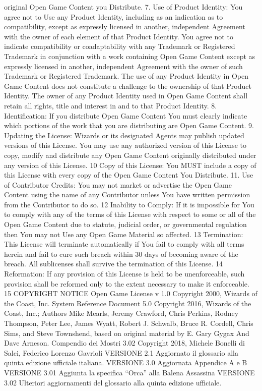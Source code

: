 \begin{multicols}{2}
original Open Game Content you Distribute.
7. Use of Product Identity: You agree not to Use
any Product Identity, including as an indication as
to compatibility, except as expressly licensed in
another, independent Agreement with the owner
of each element of that Product Identity. You
agree not to indicate compatibility or coadaptability with any Trademark or Registered
Trademark in conjunction with a work containing
Open Game Content except as expressly licensed
in another, independent Agreement with the
owner of such Trademark or Registered
Trademark. The use of any Product Identity in
Open Game Content does not constitute a
challenge to the ownership of that Product
Identity. The owner of any Product Identity used
in Open Game Content shall retain all rights, title
and interest in and to that Product Identity.
8. Identification: If you distribute Open Game
Content You must clearly indicate which portions
of the work that you are distributing are Open
Game Content.
9. Updating the License: Wizards or its designated
Agents may publish updated versions of this
License. You may use any authorized version of
this License to copy, modify and distribute any
Open Game Content originally distributed under
any version of this License.
10 Copy of this License: You MUST include a copy
of this License with every copy of the Open Game
Content You Distribute.
11. Use of Contributor Credits: You may not
market or advertise the Open Game Content
using the name of any Contributor unless You
have written permission from the Contributor to
do so.
12 Inability to Comply: If it is impossible for You
to comply with any of the terms of this License
with respect to some or all of the Open Game
Content due to statute, judicial order, or
governmental regulation then You may not Use
any Open Game Material so affected.
13 Termination: This License will terminate
automatically if You fail to comply with all terms
herein and fail to cure such breach within 30 days
of becoming aware of the breach. All sublicenses
shall survive the termination of this License.
14 Reformation: If any provision of this License is
held to be unenforceable, such provision shall be
reformed only to the extent necessary to make it
enforceable.
15 COPYRIGHT NOTICE
Open Game License v 1.0 Copyright 2000,
Wizards of the Coast, Inc.
System Reference Document 5.0 Copyright 2016,
Wizards of the Coast, Inc.; Authors Mike Mearls,
Jeremy Crawford, Chris Perkins, Rodney Thompson,
Peter Lee, James Wyatt, Robert J. Schwalb, Bruce R.
Cordell, Chris Sims, and Steve Townshend, based on
original material by E. Gary Gygax And Dave
Arneson.
Compendio dei Mostri 3.02 Copyright 2018, Michele
Bonelli di Salci, Federico Lorenzo Gavrioli
VERSIONE 2.1
Aggiornato il glossario alla quinta edizione ufficiale
italiana.
VERSIONE 3.0
Aggiornata Appendice A e B
VERSIONE 3.01
Aggiunta la specifica “Orca” alla Balena Assassina
VERSIONE 3.02
Ulteriori aggiornamenti del glossario alla quinta
edizione ufficiale.

\end{multicols}